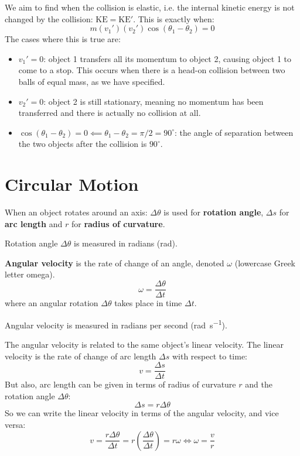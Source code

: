 \documentclass{article}
\newcommand{\definition}[1]{\begin{tcolorbox}[colback=red!5!white,colframe=red!75!black,parbox=false] #1 \end{tcolorbox}}
\begin{document}
We aim to find when the collision is elastic, i.e. the internal kinetic energy is not changed by the collision: $\text{KE}=\text{KE}'$. This is exactly when:
\begin{equation*}
    m(v_1')(v_2')\cos(\theta_1-\theta_2)=0
\end{equation*}
The cases where this is true are:
\begin{itemize}
    \item $v_1'=0$: object 1 transfers all its momentum to object 2, causing object 1 to come to a stop. This occurs when there is a head-on collision between two balls of equal mass, as we have specified.
	\item $v_2'=0$: object 2 is still stationary, meaning no momentum has been transferred and there is actually no collision at all.
	\item $\cos(\theta_1-\theta_2)=0 \impliedby \theta_1-\theta_2=\pi/2=90^\circ$: the angle of separation between the two objects after the collision is $90^\circ$.
\end{itemize}

\section{Circular Motion}

\definition{When an object rotates around an axis: $\Delta \theta$ is used for \textbf{rotation angle}, $\Delta s$ for \textbf{arc length} and $r$ for \textbf{radius of curvature}.}

Rotation angle $\Delta \theta$ is measured in radians (\si{rad}).

\definition{\textbf{Angular velocity} is the rate of change of an angle, denoted $\omega$ (lowercase Greek letter omega).
\begin{equation*}
    \omega=\frac{\Delta \theta}{\Delta t}
\end{equation*}
where an angular rotation $\Delta \theta$ takes place in time $\Delta t$.}

Angular velocity is measured in radians per second (\si{\radian\per\second}).

The angular velocity is related to the same object's linear velocity. The linear velocity is the rate of change of arc length $\Delta s$ with respect to time:
\begin{equation*}
    v=\frac{\Delta s}{\Delta t}
\end{equation*}
But also, arc length can be given in terms of radius of curvature $r$ and the rotation angle $\Delta \theta$:
\begin{equation*}
    \Delta s=r\Delta\theta
\end{equation*}
So we can write the linear velocity in terms of the angular velocity, and vice versa:
\begin{equation*}
    v=\frac{r\Delta \theta}{\Delta t}=r \left( \frac{\Delta\theta}{\Delta t} \right)=r\omega
	\iff 
	\omega=\frac{v}{r}
\end{equation*}
\end{document}
